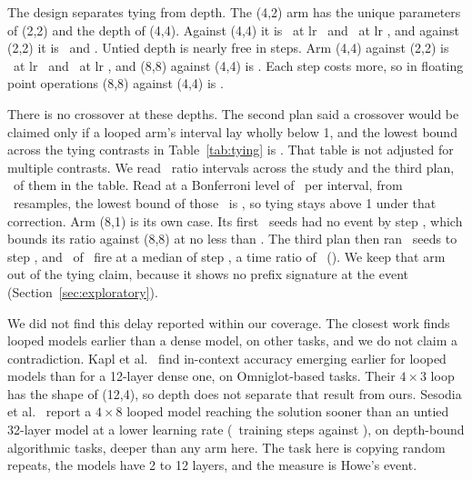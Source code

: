 \documentclass[10pt]{article}
\newcommand{\arm}[2]{(#1,#2)}
\begin{document}
The design separates tying from depth. The \arm{4}{2} arm has the unique parameters of \arm{2}{2} and the depth of \arm{4}{4}. Against \arm{4}{4} it is \nFitFourTwoVsFourFourHi\ at lr \nLrHi\ and \nFitFourTwoVsFourFourLo\ at lr \nLrLo, and against \arm{2}{2} it is \nFitFourTwoVsTwoTwoHi\ and \nFitFourTwoVsTwoTwoLo. Untied depth is nearly free in steps. Arm \arm{4}{4} against \arm{2}{2} is \nFitFourFourVsTwoTwoHi\ at lr \nLrHi\ and \nFitFourFourVsTwoTwoLo\ at lr \nLrLo, and \arm{8}{8} against \arm{4}{4} is \nFitEightEightVsFourFourHi. Each step costs more, so in floating point operations \arm{8}{8} against \arm{4}{4} is \nFlopEightEightVsFourFourHi.

There is no crossover at these depths. The second plan said a crossover would be claimed only if a looped arm's interval lay wholly below 1, and the lowest bound across the tying contrasts in Table~\ref{tab:tying} is \nLowestTyingBound. That table is not adjusted for multiple contrasts. We read \nIntervalsRead\ ratio intervals across the study and the third plan, \nTyingIntervals\ of them in the table. Read at a Bonferroni level of \nAdjustedLevel\ per interval, from \nAdjustedResamples\ resamples, the lowest bound of those \nTyingIntervals\ is \nAdjustedBound, so tying stays above 1 under that correction. Arm \arm{8}{1} is its own case. Its first \nEightOneEarlierSeeds\ seeds had no event by step \nEightOneEarlierBudget, which bounds its ratio against \arm{8}{8} at no less than \nEightOneBound. The third plan then ran \nNEightOneHi\ seeds to step \nBudgetEightOneHi, and \nEvEightOneHi\ of \nNEightOneHi\ fire at a median of step \nMedEightOneHi, a time ratio of \nFitEightOneVsEightEightHi\ (\nFitCiEightOneVsEightEightHi). We keep that arm out of the tying claim, because it shows no prefix signature at the event (Section~\ref{sec:exploratory}).

We did not find this delay reported within our coverage. The closest work finds looped models earlier than a dense model, on other tasks, and we do not claim a contradiction. Kapl et al.~\cite{kapl} find in-context accuracy emerging earlier for looped models than for a 12-layer dense one, on Omniglot-based tasks. Their $4\times3$ loop has the shape of \arm{12}{4}, so depth does not separate that result from ours. Sesodia et al.~\cite{sesodia} report a $4\times8$ looped model reaching the solution sooner than an untied 32-layer model at a lower learning rate (\nSoonerLooped\ training steps against \nSoonerUntied), on depth-bound algorithmic tasks, deeper than any arm here. The task here is copying random repeats, the models have 2 to 12 layers, and the measure is Howe's event.
\end{document}
